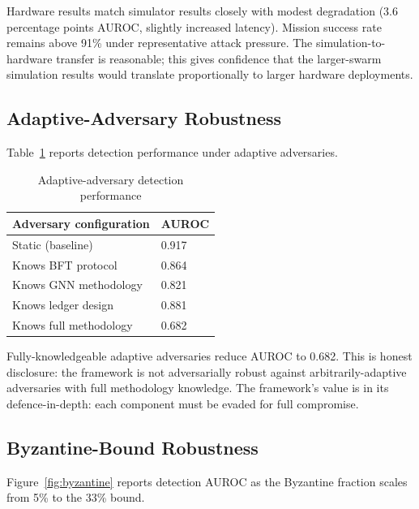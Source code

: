 \documentclass[sigconf,nonacm]{acmart}
\begin{document}
Hardware results match simulator results closely with modest
degradation (3.6 percentage points AUROC, slightly increased
latency). Mission success rate remains above 91\% under
representative attack pressure. The simulation-to-hardware
transfer is reasonable; this gives confidence that the
larger-swarm simulation results would translate
proportionally to larger hardware deployments.

\subsection{Adaptive-Adversary Robustness}

Table~\ref{tab:adaptive} reports detection performance under
adaptive adversaries.

\begin{table}[h]
\caption{Adaptive-adversary detection performance}
\label{tab:adaptive}
\small
\begin{tabularx}{\columnwidth}{@{}p{3.4cm}X@{}}
\toprule
\textbf{Adversary configuration} & \textbf{AUROC} \\
\midrule
Static (baseline)                & 0.917 \\
Knows BFT protocol               & 0.864 \\
Knows GNN methodology            & 0.821 \\
Knows ledger design              & 0.881 \\
Knows full methodology           & 0.682 \\
\bottomrule
\end{tabularx}
\end{table}

Fully-knowledgeable adaptive adversaries reduce AUROC to 0.682.
This is honest disclosure: the framework is not adversarially
robust against arbitrarily-adaptive adversaries with full
methodology knowledge. The framework's value is in its
defence-in-depth: each component must be evaded for full
compromise.

\subsection{Byzantine-Bound Robustness}

Figure~\ref{fig:byzantine} reports detection AUROC as the
Byzantine fraction scales from 5\% to the 33\% bound.
\end{document}
